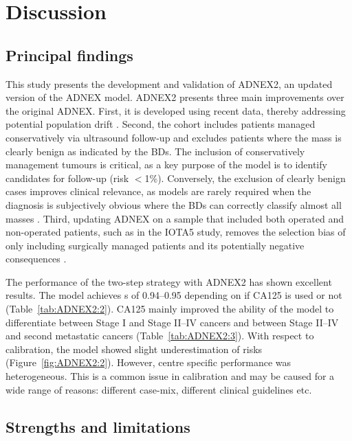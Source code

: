 \section{Discussion}

\subsection{Principal findings}

This study presents the development and validation of ADNEX2, an updated version of the \gls{ADNEX} model. ADNEX2 presents three main improvements over the original \gls{ADNEX}. First, it is developed using recent data, thereby addressing potential population drift \cite{vancalsterThereNoSuch2023}. Second, the cohort includes patients managed conservatively via ultrasound follow-up and excludes patients where the mass is clearly benign as indicated by the \glspl{BD}. The inclusion of conservatively management tumours is critical, as a key purpose of the model is to identify candidates for follow-up (risk $<$1\%). Conversely, the exclusion of clearly benign cases improves clinical relevance, as models are rarely required when the diagnosis is subjectively obvious where the \glspl{BD} can correctly classify almost all masses \cite{landolfoBenignDescriptorsADNEX2023}. Third, updating \gls{ADNEX} on a sample that included both operated and non-operated patients, such as in the \gls{IOTA}5 study, removes the selection bias of only including surgically managed patients and its potentially negative consequences \cite{timmermanIOTAPhase52025}.

The performance of the two-step strategy with ADNEX2 has shown excellent results. The model achieves s of 0.94--0.95 depending on if \gls{CA125} is used or not (Table~\ref{tab:ADNEX2:2}). \gls{CA125} mainly improved the ability of the model to differentiate between Stage I and Stage II--IV cancers and between Stage II--IV and second metastatic cancers (Table~\ref{tab:ADNEX2:3}). With respect to calibration, the model showed slight underestimation of risks (Figure~\ref{fig:ADNEX2:2}). However, centre specific performance was heterogeneous. This is a common issue in calibration \cite{vanAmsterdamCausalViewpoint2024, guptaDevelopmentValidationISARIC2021,steyerbergAssessmentHeterogeneityIndividual2019,vancalsterValidationModelsDiagnose2020} and may be caused for a wide range of reasons: different case-mix, different clinical guidelines etc.

\subsection{Strengths and limitations}

